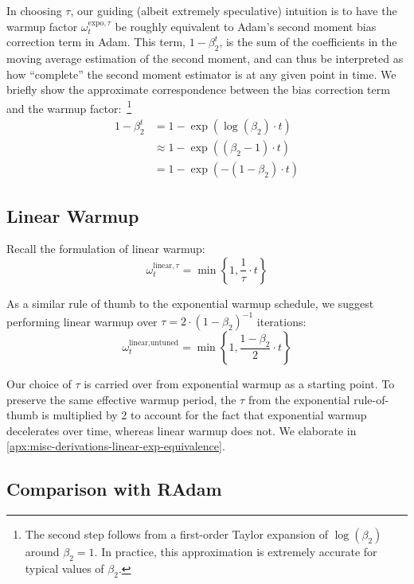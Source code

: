 {In choosing $\tau$, our guiding (albeit extremely speculative) intuition is to have the warmup factor $\omega_t^{\text{expo}, \tau}$ be roughly equivalent to Adam's second moment bias correction term in Adam. This term, $1 - \beta_2^t$, is the sum of the coefficients in the moving average estimation of the second moment, and can thus be interpreted as how ``complete'' the second moment estimator is at any given point in time. We briefly show the approximate correspondence between the bias correction term and the warmup factor:~\footnote{The second step follows from a first-order Taylor expansion of $\log(\beta_2)$ around $\beta_2 = 1$. In practice, this approximation is extremely accurate for typical values of $\beta_2$.}
\begin{align*}
    1 - \beta_2^t &= 1 - \exp \left( \log(\beta_2) \cdot t \right) \\
    &\approx 1 - \exp \left( (\beta_2 - 1) \cdot t \right) \\
    &= 1 - \exp \left( -(1 - \beta_2) \cdot t \right)
\end{align*}

\subsection{Linear Warmup}

Recall the formulation of linear warmup:
\begin{equation*}
    \omega_t^{\text{linear}, \tau} = \min \left\{ 1, \frac{1}{\tau} \cdot t \right\}
\end{equation*}

As a similar rule of thumb to the exponential warmup schedule, we suggest performing linear warmup over $\tau = 2 \cdot \left( 1 - \beta_2 \right)^{-1}$ iterations:
\begin{equation}
    \label{eqn:linear-rule-of-thumb}
    \omega_t^{\text{linear}, \text{untuned}} = \min \left\{ 1, \frac{1 - \beta_2}{2} \cdot t \right\}
\end{equation}

Our choice of $\tau$ is carried over from exponential warmup as a starting point. To preserve the same effective warmup period, the $\tau$ from the exponential rule-of-thumb is multiplied by 2 to account for the fact that exponential warmup decelerates over time, whereas linear warmup does not. We elaborate in \cref*{apx:misc-derivations-linear-exp-equivalence}.

\subsection{Comparison with RAdam}

}
